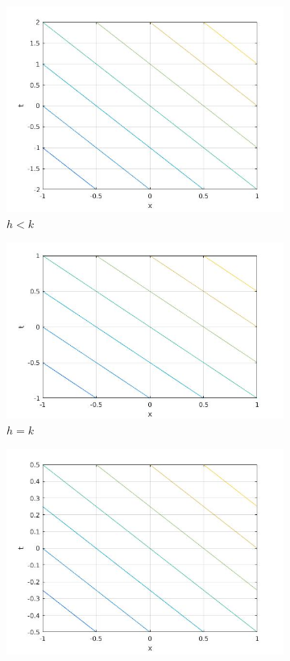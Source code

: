 \begin{figure}[H]
\centering
\begin{subfigure}[b]{0.3\textwidth}
  \includegraphics[width=\textwidth]{Images/advection_h<k.jpg}
  \caption{$h<k$}
  \label{fig:aci1}
\end{subfigure}
\hfill
\begin{subfigure}[b]{0.3\textwidth}
  \includegraphics[width=\textwidth]{Images/advection_h=k.jpg}
  \caption{$h=k$}
  \label{fig:aci2}
\end{subfigure}
\hfill
\begin{subfigure}[b]{0.3\textwidth}
  \includegraphics[width=\textwidth]{Images/advection_h>k.jpg}

\end{subfigure}
\end{figure}
